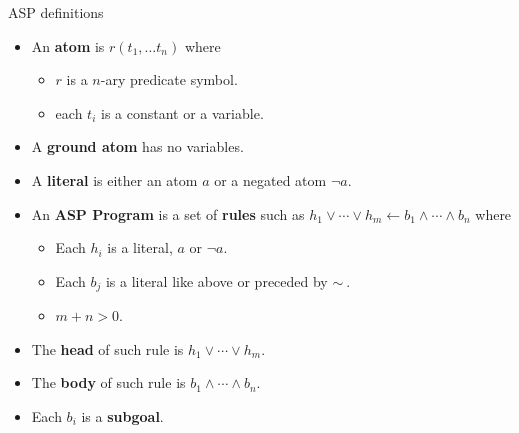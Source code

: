 \documentclass[bigger]{beamer}
\newcommand{\naf}{\ensuremath{\sim\!\!}}
\begin{document}
    \begin{frame}{ASP definitions}
        \begin{itemize}
            \item An \textbf{atom} is $r(t_1, \ldots t_n)$ where
            \begin{itemize}
                \item $r$ is a $n$-ary predicate symbol.
                \item each $t_i$ is a constant or a variable.
            \end{itemize}
            \item A \textbf{ground atom} has no variables.
            \item A \textbf{literal} is either an atom $a$ or a negated atom $\neg a$.
            \item An \textbf{ASP Program} is a set of \textbf{rules} such as $h_1 \vee \cdots \vee h_m \leftarrow b_1 \wedge \cdots \wedge b_n$ where
            \begin{itemize}
                \item Each $h_i$ is a literal, $a$ or $\neg a$.
                \item Each $b_j$ is a literal like above or preceded by $\naf~$.
                \item $m + n > 0$.
            \end{itemize}
            \item The \textbf{head} of such rule is $h_1 \vee \cdots \vee h_m$.
            \item The \textbf{body} of such rule is $b_1 \wedge \cdots \wedge b_n$.
            \item Each $b_i$ is a \textbf{subgoal}.
        \end{itemize}
    \end{frame}
\end{document}
